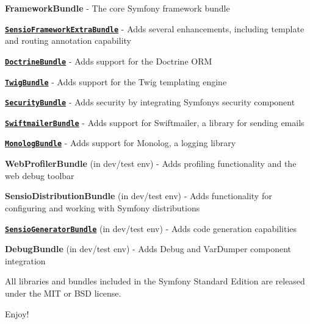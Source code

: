 \begin{DoxyItemize}
\item {\bfseries Framework\+Bundle} -\/ The core Symfony framework bundle
\item \href{https://symfony.com/doc/current/bundles/SensioFrameworkExtraBundle/index.html}{\tt {\bfseries Sensio\+Framework\+Extra\+Bundle}} -\/ Adds several enhancements, including template and routing annotation capability
\item \href{https://symfony.com/doc/3.2/doctrine.html}{\tt {\bfseries Doctrine\+Bundle}} -\/ Adds support for the Doctrine O\+RM
\item \href{https://symfony.com/doc/3.2/templating.html}{\tt {\bfseries Twig\+Bundle}} -\/ Adds support for the Twig templating engine
\item \href{https://symfony.com/doc/3.2/security.html}{\tt {\bfseries Security\+Bundle}} -\/ Adds security by integrating Symfony\textquotesingle{}s security component
\item \href{https://symfony.com/doc/3.2/email.html}{\tt {\bfseries Swiftmailer\+Bundle}} -\/ Adds support for Swiftmailer, a library for sending emails
\item \href{https://symfony.com/doc/3.2/logging.html}{\tt {\bfseries Monolog\+Bundle}} -\/ Adds support for Monolog, a logging library
\item {\bfseries Web\+Profiler\+Bundle} (in dev/test env) -\/ Adds profiling functionality and the web debug toolbar
\item {\bfseries Sensio\+Distribution\+Bundle} (in dev/test env) -\/ Adds functionality for configuring and working with Symfony distributions
\item \href{https://symfony.com/doc/current/bundles/SensioGeneratorBundle/index.html}{\tt {\bfseries Sensio\+Generator\+Bundle}} (in dev/test env) -\/ Adds code generation capabilities
\item {\bfseries Debug\+Bundle} (in dev/test env) -\/ Adds Debug and Var\+Dumper component integration
\end{DoxyItemize}

All libraries and bundles included in the Symfony Standard Edition are released under the M\+IT or B\+SD license.

Enjoy! 